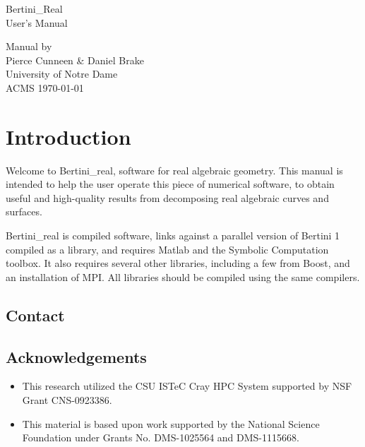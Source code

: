 \documentclass[10pt]{article}
\begin{document}
\pagestyle{plain} 
	\setcounter{page}{1}




\thispagestyle{empty}


\begin{center}


\quad %
\vspace{3in}


{\LARGE Bertini\_Real}\\[\baselineskip]
User's Manual
\vskip0.5in

\vfill%

\end{center}
\null
\vfill
\begin{singlespace}
Manual by\\
Pierce Cunneen \& Daniel Brake\\
University of Notre Dame \\
ACMS \hfill \today
\end{singlespace}
\newpage





	\tableofcontents
	\eject
	\setcounter{page}{1}
	\eject



\section{Introduction}


Welcome to Bertini\_real, software for real algebraic geometry.  This manual is intended to help the user operate this piece of numerical software, to obtain useful and high-quality results from decomposing real algebraic curves and surfaces.

Bertini\_real is compiled software, links against a parallel version of Bertini 1 compiled as a library, and requires Matlab and the Symbolic Computation toolbox.  It also requires several other libraries, including a few from Boost, and an installation of MPI.  All libraries should be compiled using the same compilers.  

\subsection{Contact}
\label{sec:contact}

\subsection*{Acknowledgements}
\begin{itemize}
\item  This research utilized the CSU ISTeC Cray HPC System supported by NSF Grant CNS-0923386.
\item  This material is based upon work supported by the National Science Foundation under Grants No. DMS-1025564 and DMS-1115668.
\end{itemize}
\end{document}
